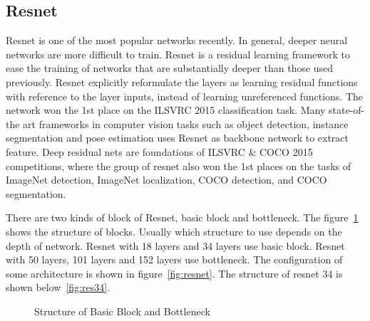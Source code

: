\documentclass{article}
\begin{document}
\subsection{Resnet}

Resnet\cite{he2016deep} is one of the most popular networks recently. In general, deeper neural networks are more difficult to train. Resnet is a residual learning framework to ease the training
of networks that are substantially deeper than those used
previously. Resnet explicitly reformulate the layers as learning
residual functions with reference to the layer inputs, instead
of learning unreferenced functions. The network won the 1st place on the ILSVRC 2015 classification task. Many state-of-the art frameworks in computer vision tasks such as object detection, instance segmentation and pose estimation uses Resnet as backbone network to extract feature. Deep residual nets are foundations of ILSVRC
\& COCO 2015 competitions, where the group of resnet also won the 1st
places on the tasks of ImageNet detection, ImageNet localization,
COCO detection, and COCO segmentation.

There are two kinds of block of Resnet, basic block and bottleneck. The figure~\ref{fig:basic-block} shows the structure of blocks. Usually which structure to use depends on the depth of network. Resnet with 18 layers and 34 layers use basic block. Resnet with 50 layers, 101 layers and 152 layers use bottleneck. The configuration of some architecture is shown in figure~\ref{fig:resnet}. The structure of resnet 34 is shown below~\ref{fig:res34}.

\begin{figure}[!htb]
	\centering
{}
\caption{Structure of Basic Block and Bottleneck\protect\footnotemark}
\label{fig:basic-block}
\end{figure}
\end{document}
